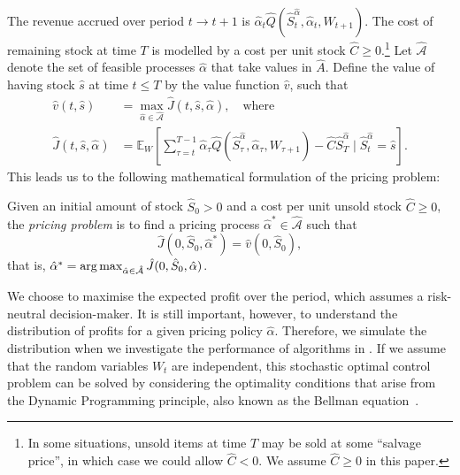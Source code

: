\documentclass[main.tex]{subfiles}
\begin{document}
The revenue accrued over period $t\to t+1$ is $\hat{\alpha}_t\hat{Q}(\hat{S}_t^{\hat{\alpha}},\hat{\alpha}_t,W_{t+1})$.
The cost of remaining stock at time $T$ is modelled by a cost per unit
stock $\hat{C}\geq 0$.\footnote{In some situations, unsold items at time $T$
  may be sold at some ``salvage price'', in which case we could allow
  $\hat{C}<0$. We assume $\hat{C}\geq 0$ in this paper.}
Let $\hat{\mathcal{A}}$ denote the set of feasible processes $\hat{\alpha}$ that take values
in $\hat{A}$.
Define the value of having stock $\hat{s}$ at time $t\leq T$
by the value function $\hat{v}$, such that
\begin{align}\label{eq:value_function_def}
  \hat{v}(t,\hat{s})&=\max_{\hat{\alpha}\in\hat{\mathcal{A}}} \hat{J}(t,\hat{s},\hat{\alpha}),\quad\text{where}\\
  \hat{J}(t,\hat{s},\hat{\alpha})&=
                                   \mathbb{E}_{W}\left[ \sum_{\tau=t}^{T-1}
                                   \hat{\alpha}_\tau \hat{Q}(\hat{S}_\tau^{\hat{\alpha}},\hat{\alpha}_\tau,W_{\tau+1})
                                   - \hat{C}\hat{S}_T^{\hat{\alpha}} \mid \hat{S}_t^{\hat{\alpha}} = \hat{s}
                                   \right].
                                   \label{eq:value_function_def2}
\end{align}
This leads us to the following mathematical formulation of the pricing
problem:
\begin{mydef}
  Given an initial amount of stock $\hat{S}_0>0$ and a cost per unit unsold stock $\hat{C}\geq
  0$, the \emph{pricing problem} is to find a pricing process $\hat{\alpha}^*\in\hat{\mathcal{A}}$ such that
  \begin{equation}
    \hat{J}(0,\hat{S}_0,\hat{\alpha}^*) = \hat{v}(0,\hat{S}_0),
  \end{equation}
  that is, $\hat{\alpha}^* = \operatorname*{arg\,max}_{\hat{\alpha}\in\hat{\mathcal{A}}}\hat{J}(0,\hat{S}_0,\hat{\alpha})$.
\end{mydef}
We choose to maximise the expected profit over the period, which
assumes a risk-neutral decision-maker.
It is still
important, however,
to understand the distribution of profits for a given pricing policy
$\hat{\alpha}$. Therefore, we simulate the distribution when
we investigate the performance of algorithms in
. %
If we assume that the random variables $W_t$ are independent, this
stochastic optimal control problem can be solved by
considering the optimality conditions that arise from the Dynamic
Programming principle, also known as the Bellman equation~\citep{bertsekas2005dynamic}.
\end{document}
